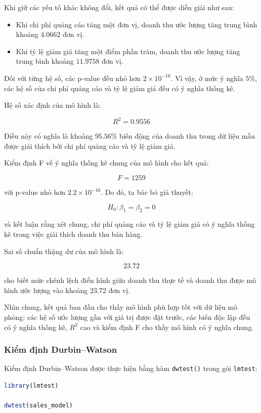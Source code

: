 \documentclass[12pt,a4paper]{article}
\begin{document}
Khi giữ các yếu tố khác không đổi, kết quả có thể được diễn giải như sau:

\begin{itemize}
    \item Khi chi phí quảng cáo tăng một đơn vị, doanh thu ước lượng tăng trung bình khoảng $4.0662$ đơn vị.
    
    \item Khi tỷ lệ giảm giá tăng một điểm phần trăm, doanh thu ước lượng tăng trung bình khoảng $11.9758$ đơn vị.
\end{itemize}

Đối với từng hệ số, các p-value đều nhỏ hơn $2\times10^{-16}$. Vì vậy, ở mức ý nghĩa $5\%$, các hệ số của chi phí quảng cáo và tỷ lệ giảm giá đều có ý nghĩa thống kê.

Hệ số xác định của mô hình là:

\[
R^2
=
0.9556
\]

Điều này có nghĩa là khoảng $95.56\%$ biến động của doanh thu trong dữ liệu mẫu được giải thích bởi chi phí quảng cáo và tỷ lệ giảm giá.

Kiểm định F về ý nghĩa thống kê chung của mô hình cho kết quả:

\[
F
=
1259
\]

với p-value nhỏ hơn $2.2\times10^{-16}$. Do đó, ta bác bỏ giả thuyết:

\[
H_0:
\beta_1
=
\beta_2
=
0
\]

và kết luận rằng xét chung, chi phí quảng cáo và tỷ lệ giảm giá có ý nghĩa thống kê trong việc giải thích doanh thu bán hàng.

Sai số chuẩn thặng dư của mô hình là:

\[
23.72
\]

cho biết mức chênh lệch điển hình giữa doanh thu thực tế và doanh thu được mô hình ước lượng vào khoảng $23.72$ đơn vị.

Nhìn chung, kết quả ban đầu cho thấy mô hình phù hợp tốt với dữ liệu mô phỏng: các hệ số ước lượng gần với giá trị được đặt trước, các biến độc lập đều có ý nghĩa thống kê, $R^2$ cao và kiểm định F cho thấy mô hình có ý nghĩa chung.

\subsubsection{Kiểm định Durbin--Watson}

Kiểm định Durbin--Watson được thực hiện bằng hàm \texttt{dwtest()} trong
gói \texttt{lmtest}:

\begin{lstlisting}[language=R]
library(lmtest)

dwtest(sales_model)
\end{lstlisting}
\end{document}
